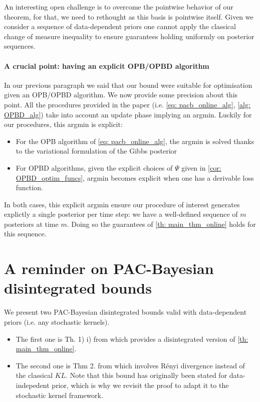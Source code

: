 An interesting open challenge is to overcome the pointwise behavior of our theorem, for that, we need to rethought \cite[Thm 2.1]{rivasplata2020pac} as this basis is pointwise itself. Given we consider a sequence of data-dependent priors one cannot apply the classical change of measure inequality to ensure guarantees holding uniformly on posterior sequences.

\paragraph{A crucial point: having an explicit OPB/OPBD algorithm}

In our previous paragraph we said that our bound were suitable for optimisation given an OPB/OPBD algorithm. We now provide some precision about this point. All the procedures provided in the paper (i.e. \cref{eq: pacb_online_alg}, \cref{alg: OPBD_alg}) take into account an update phase implying an argmin. Luckily for our procedures, this argmin is explicit:
\begin{itemize}
  \item For the OPB algorithm of \cref{eq: pacb_online_alg}, the argmin is solved thanks to the variational formulation of the Gibbs posterior
  \item For OPBD algorithms, given the explicit choices of $\Psi$ given in \cref{cor: OPBD_optim_funcs}, argmin becomes explicit when one has a derivable loss function.
\end{itemize}

In both cases, this explicit argmin ensure our procedure of interest generates explictly a single posterior per time step: we have a well-defined sequence of $m$ posteriors at time $m$.
Doing so the guarantees of \cref{th: main_thm_online} holds for this sequence.


\section{A reminder on PAC-Bayesian disintegrated bounds}
\label{sec: disintegrated_bounds}

We present two PAC-Bayesian disintegrated bounds valid with data-dependent priors (i.e. any stochastic kernels).
\begin{itemize}
  \item The first one is Th. 1) i) from \cite{rivasplata2020pac} which provides a disintegrated version of \cref{th: main_thm_online}.  
  \item The second one is Thm 2. from \cite{viallard2023general} which involves Rényi divergence instead of the classical $KL$. Note that this bound has originally been stated for data-indepedent prior, which is why we revisit the proof to adapt it to the stochastic kernel framework.
\end{itemize}



